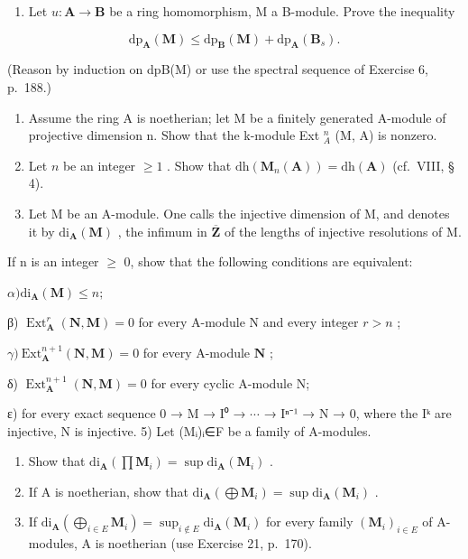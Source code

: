 
\begin{enumerate}
\def\labelenumi{\arabic{enumi})}
\tightlist
\item
  Let \(u: \mathbf{A} \to \mathbf{B}\) be a ring homomorphism, M a B-module. Prove the inequality
\end{enumerate}

\[
\mathrm{dp} _ {\mathbf {A}} (\mathbf {M}) \leqslant \mathrm{dp} _ {\mathbf {B}} (\mathbf {M}) + \mathrm{dp} _ {\mathbf {A}} (\mathbf {B} _ {s}).
\]

(Reason by induction on dpB(M) or use the spectral sequence of Exercise 6, p.~188.)

\begin{enumerate}
\def\labelenumi{\arabic{enumi})}
\setcounter{enumi}{1}
\item
  Assume the ring A is noetherian; let M be a finitely generated A-module of projective dimension n. Show that the k-module Ext \(_{A}^{n}\) (M, A) is nonzero.
\item
  Let \(n\) be an integer \(\geqslant 1\) . Show that \(\mathrm{dh}(\mathbf{M}_n(\mathbf{A})) = \mathrm{dh}(\mathbf{A})\) (cf.~VIII, § 4).
\item
  Let M be an A-module. One calls the injective dimension of M, and denotes it by \(\mathrm{di}_{\mathbf{A}}(\mathbf{M})\) , the infimum in \(\overline{\mathbf{Z}}\) of the lengths of injective resolutions of M.
\end{enumerate}

If n is an integer \(\geqslant\) 0, show that the following conditions are equivalent:

\(\alpha)\mathrm{di}_{\mathbf{A}}(\mathbf{M})\leqslant n;\)

β) \(\operatorname{Ext}_{\mathbf{A}}^{r}(\mathbf{N},\mathbf{M}) = 0\) for every A-module N and every integer \(r > n\) ;

\(\gamma)\ \mathrm{Ext}_{\mathbf{A}}^{n+1}(\mathbf{N},\mathbf{M}) = 0\) for every A-module \(\mathbf{N}\) ;

δ) \(\operatorname{Ext}_{\mathbf{A}}^{n+1}(\mathbf{N},\mathbf{M})=0\) for every cyclic A-module N;

ε) for every exact sequence 0 → M → I⁰ → \(\cdots\) → Iⁿ⁻¹ → N → 0, where the Iᵏ are injective, N is injective. 5) Let (Mᵢ)ᵢ∈F be a family of A-modules.

\begin{enumerate}
\def\labelenumi{\alph{enumi})}
\item
  Show that \(\mathrm{di}_{\mathbf{A}}(\prod \mathbf{M}_i) = \sup \mathrm{di}_{\mathbf{A}}(\mathbf{M}_i)\) .
\item
  If A is noetherian, show that \(\mathrm{di}_{\mathbf{A}}(\bigoplus \mathbf{M}_i) = \sup \mathrm{di}_{\mathbf{A}}(\mathbf{M}_i)\) .
\item
  If \(\mathrm{di}_{\mathbf{A}}(\bigoplus_{i\in E}\mathbf{M}_{i}) = \sup_{i\notin E}\mathrm{di}_{\mathbf{A}}(\mathbf{M}_{i})\) for every family \((\mathbf{M}_i)_{i\in E}\) of A-modules, A is noetherian (use Exercise 21, p.~170).
\end{enumerate}


